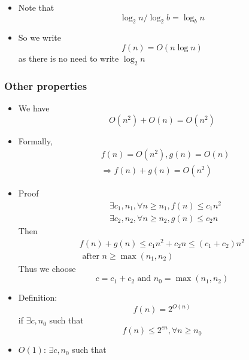 \begin{frame}[allowframebreaks]
\begin{itemize}
\item Note that
  \begin{equation*}
 \log_2 n / \log_2 b= \log_b n
\end{equation*}
\item So we write
  \begin{equation*}
  f(n)=O(n\log n)
\end{equation*}
as there is no need to write $\log_2 n$
\end{itemize}\end{frame} \begin{frame}[allowframebreaks] \frametitle{Other properties}
  \begin{itemize}
  \item We have
    \begin{equation*}
    O(n^2) + O(n) = O(n^2)
  \end{equation*}
\item Formally,
  \begin{equation*}
    \begin{split}
      & f(n) = O(n^2), g(n) = O(n)\\
      & \Rightarrow f(n) + g(n) = O(n^2)
    \end{split}
  \end{equation*}
\item Proof
  \begin{equation*}
    \begin{split}
      & \exists c_1, n_1, \forall n \geq n_1, f(n) \leq c_1 n^2 \\
      & \exists c_2, n_2, \forall n \geq n_2, g(n) \leq c_2 n
    \end{split}
  \end{equation*}
Then
\begin{gather*}
  f(n) + g(n) \leq c_1 n^2 + c_2 n \leq (c_1+c_2) n^2\\
  \text{ after } n \geq \max (n_1, n_2)
\end{gather*}
Thus we choose
\begin{equation*}
  c = c_1 + c_2 \text{ and } n_0 = \max(n_1, n_2)
\end{equation*}
\item Definition:
  \begin{equation*}
f(n) =  2^{O(n)}
\end{equation*}
if
$\exists c, n_0$ such that
\begin{equation*}
f(n) \leq 2^{cn}, \forall n \geq n_0
\end{equation*}
\item $O(1)$: $\exists c, n_0$ such that 

\end{itemize}
\end{frame}
